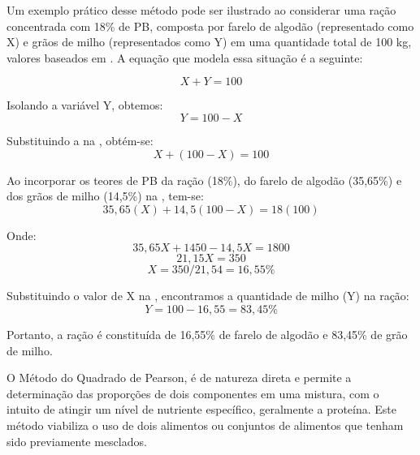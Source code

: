 Um exemplo prático desse método pode ser ilustrado ao considerar uma ração concentrada com 18\% de \gls{PB}, composta por farelo de algodão (representado como X) e grãos de milho (representados como Y) em uma quantidade total de 100 kg, valores baseados em . A equação que modela essa situação é a seguinte:

\begin{equation}
  \label{eq:algebrico1}
  X + Y = 100
\end{equation}

Isolando a variável Y, obtemos:
\begin{equation}
  \label{eq:algebrico2}
  Y = 100 - X
\end{equation}

Substituindo a  na , obtém-se:
\begin{equation}
  \label{eq:algebrico3}
  X + (100 - X) = 100
\end{equation}

Ao incorporar os teores de \gls{PB} da ração (18\%), do farelo de algodão (35,65\%) e dos grãos de milho (14,5\%) na , tem-se:
\begin{equation}
  \label{eq:algebrico4}
  35,65 (X) + 14,5 (100 - X) = 18 (100)
\end{equation}

Onde:
\begin{equation}
  \label{eq:algebrico5}
  35,65X + 1450 - 14,5X = 1800
\end{equation}
\begin{equation}
  \label{eq:algebrico6}
  21,15X = 350
\end{equation}
\begin{equation}
  \label{eq:algebrico7}
  X = 350 / 21,54 = 16,55\%
\end{equation}

Substituindo o valor de X na , encontramos a quantidade de milho (Y) na ração:
\begin{equation}
  \label{eq:algebrico8}
  Y = 100 - 16,55 = 83,45\%
\end{equation}

Portanto, a ração é constituída de 16,55\% de farelo de algodão e 83,45\% de grão de milho.

O Método do Quadrado de Pearson, é de natureza direta e permite a determinação das proporções de dois componentes em uma mistura, com o intuito de atingir um nível de nutriente específico, geralmente a proteína. Este método viabiliza o uso de dois alimentos ou conjuntos de alimentos que tenham sido previamente mesclados.

